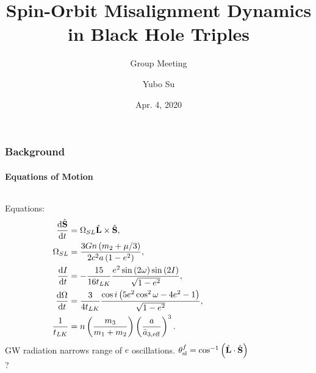 \documentclass[dvipsnames, 8pt]{beamer}
\newcommand*{\rd}[2]{\frac{\mathrm{d}#1}{\mathrm{d}#2}}
\newcommand*{\bm}[1]{\boldsymbol{\mathbf{#1}}}
\newcommand*{\uv}[1]{\hat{\bm{#1}}}
\newcommand*{\p}[1]{\left(#1\right)}
\begin{document}
\title{Spin-Orbit Misalignment Dynamics in Black Hole Triples}
\subtitle{Group Meeting}
\author{Yubo Su}
\date{Apr. 4, 2020}

\maketitle

\begin{frame}
    \frametitle{Background}
    \framesubtitle{Equations of Motion}

    \begin{columns}
        \begin{column}{0.5\textwidth}
            Equations:
            \begin{align}
                \rd{\uv{S}}{t} &= \Omega_{SL} \uv{L} \times \uv{S},\\
                \Omega_{SL} &= \frac{3Gn\p{m_2 + \mu/3}}{2c^2a\p{1 - e^2}},\\
                \rd{I}{t} &= -\frac{15}{16t_{LK}}\frac{e^2\sin\p{2\omega}
                    \sin \p{2I}}{\sqrt{1 - e^2}},\\
                \rd{\Omega}{t} &= \frac{3}{4t_{LK}}
                    \frac{\cos i\p{5e^2\cos^2\omega - 4e^2 - 1}}{\sqrt{1 - e^2}}
                    ,\\
                \frac{1}{t_{LK}} &= n\p{\frac{m_3}{m_1 + m_2}}
                    \p{\frac{a}{\bar{a}_{3, \rm eff}}}^3.
            \end{align}
            GW radiation narrows range of $e$ oscillations. $\theta_{\rm sl}^f =
            \cos^{-1} \p{\uv{L} \cdot \uv{S}}$?
        \end{column}
        \begin{column}{0.5\textwidth}
            \begin{figure}
                \centering
            \end{figure}
        \end{column}
    \end{columns}
\end{frame}
\end{document}
